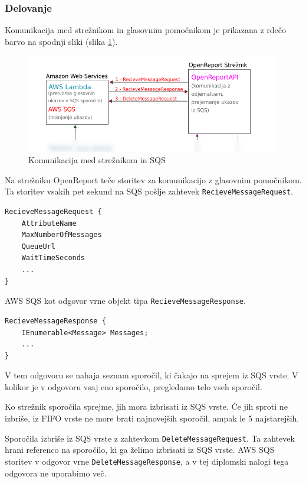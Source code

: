 \documentclass[a4paper, 12pt]{book}
\begin{document}
\subsubsection{Delovanje}

Komunikacija med strežnikom in glasovnim pomočnikom je prikazana z rdečo barvo na spodnji sliki (slika \ref{plan_sqs_server}).

\begin{figure}[H]
\begin{center}
\includegraphics[width=13cm]{plan_sqs_server}
\end{center}
\caption{Komunikacija med strežnikom in SQS}
\label{plan_sqs_server}
\end{figure}

Na strežniku OpenReport teče storitev za komunikacijo z glasovnim pomočnikom.
Ta storitev vsakih pet sekund na SQS pošlje zahtevek \texttt{RecieveMessageRequest}.

\begin{Verbatim}[commandchars=+\[\]]
RecieveMessageRequest {
    AttributeName 
    MaxNumberOfMessages 
    QueueUrl 
    WaitTimeSeconds
    ... 
} 
\end{Verbatim}

AWS SQS kot odgovor vrne objekt tipa \texttt{RecieveMessageResponse}.

\begin{Verbatim}[commandchars=+\[\]]
RecieveMessageResponse {
    IEnumerable<Message> Messages;
    ...
}
\end{Verbatim}

V tem odgovoru se nahaja seznam sporočil, ki čakajo na sprejem iz SQS vrste.
V kolikor je v odgovoru vsaj eno sporočilo, pregledamo telo vseh sporočil. 

Ko strežnik sporočila sprejme, jih mora izbrisati iz SQS vrste.
Če jih sproti ne izbriše, iz FIFO vrste ne more brati najnovejših sporočil, ampak le 5 najstarejših.

Sporočila izbriše iz SQS vrste z zahtevkom \texttt{DeleteMessageRequest}.
Ta zahtevek hrani referenco na sporočilo, ki ga želimo izbrisati iz SQS vrste.
AWS SQS storitev v odgovor vrne \texttt{DeleteMessageResponse}, a v tej diplomski nalogi tega odgovora ne uporabimo več.
\end{document}
